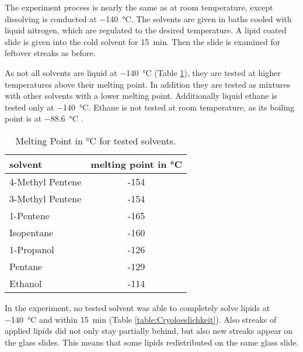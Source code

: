 The experiment process is nearly the same as at room temperature, except dissolving is conducted at \SI{-140}{\degreeCelsius}. 
The solvents are given in baths cooled with liquid nitrogen, which are regulated to the desired temperature. A lipid coated slide is given into the cold solvent for \SI{15}{\minute}. Then the slide is examined for leftover streaks as before.

As not all solvents are liquid at \SI{-140}{\degreeCelsius} (Table \ref{table:SchmelztemperaturLösungsmittel}), they are tested at higher temperatures above their melting point. In addition they are tested as mixtures with other solvents with a lower melting point. Additionally liquid ethane is tested only at  \SI{-140}{\degreeCelsius}. Ethane is not tested at room temperature, as its boiling point is at \SI{-88.6}{\degreeCelsius} \cite{PubChem.29.08.2023}.

\begin{table}[hbt!]
	\centering
	\begin{tabular}{|l|c|}
		\hline
		solvent & melting point in °C \\
		\hline
		\hline
		4-Methyl Pentene & -154 \\ 
		\hline
		3-Methyl Pentene & -154 \\
		\hline
		1-Pentene & -165 \\
		\hline
		Isopentane & -160 \\
		\hline
		1-Propanol & -126 \\
		\hline
		Pentane & -129 \\
		\hline
		Ethanol & -114 \\
		\hline
	\end{tabular}
	\caption{Melting Point in °C for tested solvents.}
	\label{table:SchmelztemperaturLösungsmittel}
\end{table}


In the experiment, no tested solvent was able to completely solve lipids at \SI{-140}{\degreeCelsius} and within \SI{15}{\minute} (Table \ref{table:Cryoloeslichkeit}). Also streaks of applied lipids did not only stay partially behind, but also new streaks appear on the glass slides. This means that some lipids redistributed on the same glass slide.

